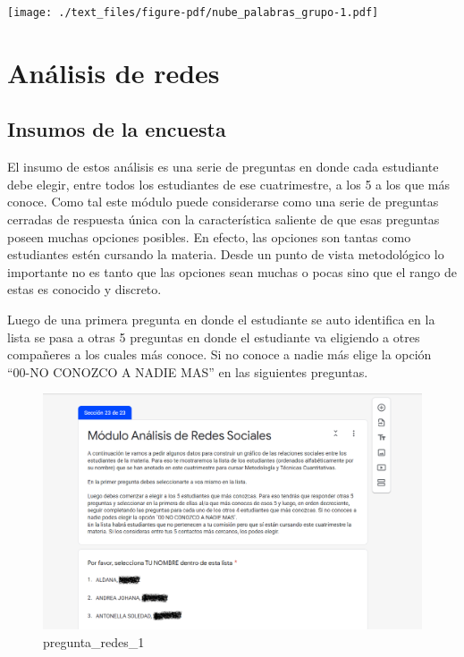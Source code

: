 \documentclass[
  letterpaper,
  DIV=11,
  numbers=noendperiod]{scrreprt}
\begin{document}
\texttt{[image: ./text\_files/figure-pdf/nube\_palabras\_grupo-1.pdf]}


\hypertarget{anuxe1lisis-de-redes}{%
\chapter{Análisis de redes}\label{anuxe1lisis-de-redes}}

\hypertarget{insumos-de-la-encuesta-2}{%
\section{Insumos de la encuesta}\label{insumos-de-la-encuesta-2}}

El insumo de estos análisis es una serie de preguntas en donde cada
estudiante debe elegir, entre todos los estudiantes de ese cuatrimestre,
a los 5 a los que más conoce. Como tal este módulo puede considerarse
como una serie de preguntas cerradas de respuesta única con la
característica saliente de que esas preguntas poseen muchas opciones
posibles. En efecto, las opciones son tantas como estudiantes estén
cursando la materia. Desde un punto de vista metodológico lo importante
no es tanto que las opciones sean muchas o pocas sino que el rango de
estas es conocido y discreto.

Luego de una primera pregunta en donde el estudiante se auto identifica
en la lista se pasa a otras 5 preguntas en donde el estudiante va
eligiendo a otres compañeres a los cuales más conoce. Si no conoce a
nadie más elige la opción ``00-NO CONOZCO A NADIE MAS'' en las
siguientes preguntas.

\begin{figure}

{\centering \includegraphics[width=6.25in,height=\textheight]{./Inputs/Images/pregunta_redes_1.png}

}

\caption{pregunta\_redes\_1}

\end{figure}
\end{document}
